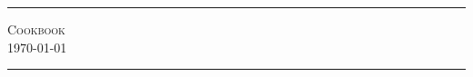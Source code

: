 \begin{titlepage}
\begin{center}
\hrule
\vspace{2cm}
\textsc{\Huge Cookbook}\\[3cm]
\setlength\fboxsep{0pt}
\setlength\fboxrule{5pt}
{\Huge \today}
\\[2cm]
\hrule

\end{center}
\end{titlepage}